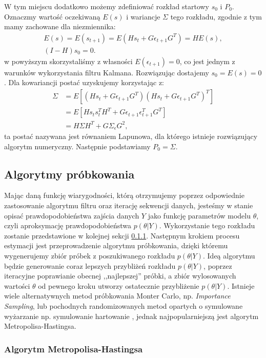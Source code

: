 W tym miejscu dodatkowo możemy zdefiniować rozkład startowy $s_0$ i $P_0$. Oznaczmy wartość oczekiwaną $E(s)$ i wariancje $\Sigma$ tego rozkładu, zgodnie z tym mamy zachowane dla niezmiennika:
\begin{gather}
    E(s) = E(s_{t+1}) = E(H s_t + G \epsilon_{t+1} G^T) = H E(s),\\
    (I - H) s_0 = 0.
\end{gather}
w powyższym skorzystaliśmy z własności $E(\epsilon_{t+1}) = 0$, co jest jednym z warunków wykorzystania filtru Kalmana. Rozwiązując dostajemy $s_0 = E(s) = 0$.
Dla kowariancji postać uzyskujemy korzystając z:
\begin{align}
    \Sigma &= E \left[ (H s_t + G \epsilon_{t+1} G^T) (H s_t + G \epsilon_{t+1} G^T)^T\right]\\
    &= E \left[ H s_t s_t^T H^T + G \epsilon_{t+1} \epsilon_{t+1}^T G^T\right]\\
    &= H \Sigma H^T + G \Sigma_{\epsilon} G^2,
\end{align}
ta postać nazywana jest równaniem Lapunowa, dla którego istnieje rozwiązujący algorytm numeryczny. Następnie podstawiamy $P_0 = \Sigma$.

\subsection{Algorytmy próbkowania}

Mając daną funkcję wiarygodności, którą otrzymujemy poprzez odpowiednie zastosowanie algorytmu filtru oraz iterację sekwencji danych, jesteśmy w stanie opisać prawdopodobieństwa zajścia danych $Y$ jako funkcję parametrów modelu $\theta$, czyli aproksymację prawdopodobieństwa $p(\theta|Y)$. Wykorzystanie tego rozkładu zostanie przedstawione w kolejnej sekcji \ref{sec:metropolis_hastings}. Następnym krokiem procesu estymacji jest przeprowadzenie algorytmu próbkowania, dzięki któremu wygenerujemy zbiór próbek z poszukiwanego rozkładu $p(\theta|Y)$. Ideą algorytmu będzie generowanie coraz lepszych przybliżeń rozkładu $p(\theta|Y)$, poprzez iteracyjne poprawianie obecnej ,,najlepszej'' próbki, a zbiór wylosowanych wartości $\theta$ od pewnego kroku utworzy ostatecznie przybliżenie $p(\theta|Y)$. Istnieje wiele alternatywnych metod próbkowania Monter Carlo, np. \emph{Importance Sampling}\cite{herbst}, lub pochodnych randomizowanych metod opartych o symulowane wyżarzanie np. symulowanie hartowanie \cite{herbst2}, jednak najpopularniejszą jest algorytm Metropolisa-Hastingsa.

\subsubsection{Algorytm Metropolisa-Hastingsa}
\label{sec:metropolis_hastings}

